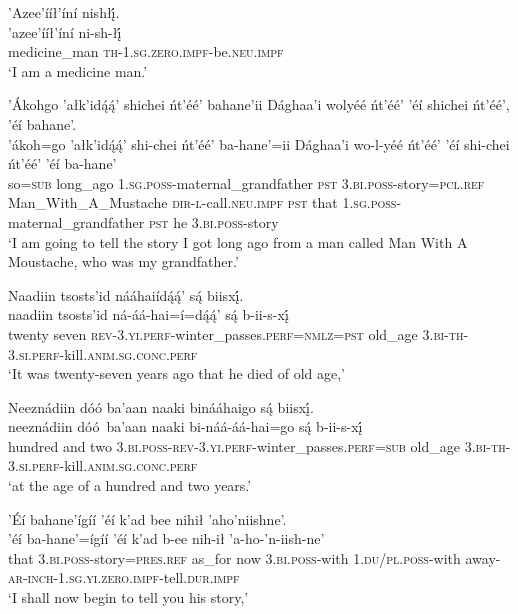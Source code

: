 \ea\label{ex:text4-1-1}
’Azee’ííł’íní nishłį́.\\
\gll ’azee’ííł’íní	ni-sh-łį́\\
     medicine\_man	\textsc{th}-1.\textsc{sg}.\textsc{zero}.\textsc{impf}-be.\textsc{neu}.\textsc{impf}\\
\glt `I am a medicine man.'
\z

\ea\label{ex:text4-1-2}
’Ákohgo ’ałk’idą́ą́’ shichei ńt’éé’ bahane’ii Dághaa’i wolyéé ńt’éé’ ’éí shichei ńt’éé’, ’éí bahane’.\\
\gll ’ákoh=go	’ałk’idą́ą́’	shi-chei	ńt’éé’	ba-hane’=ii	Dághaa’i	wo-l-yéé	ńt’éé’	’éí	shi-chei	ńt’éé’	’éí	ba-hane’\\
     so=\textsc{sub}	long\_ago	1.\textsc{sg}.\textsc{poss}-maternal\_grandfather	\textsc{pst}	3.\textsc{bi}.\textsc{poss}-story=\textsc{pcl}.\textsc{ref}	Man\_With\_A\_Mustache	\textsc{dir}-\textsc{l}-call.\textsc{neu}.\textsc{impf}	\textsc{pst}	that	1.\textsc{sg}.\textsc{poss}-maternal\_grandfather	\textsc{pst}	he	3.\textsc{bi}.\textsc{poss}-story\\
\glt `I am going to tell the story I got long ago from a man called Man With A Moustache, who was my grandfather.'
\z

\ea\label{ex:text4-1-3}
Naadiin tsosts’id nááhaiídą́ą́’ są́ biisxį́.\\
\gll naadiin	tsosts’id	ná-áá-hai=í=dą́ą́’	są́	b-ii-s-xį́\\
     twenty	seven	\textsc{rev}-3.\textsc{yi}.\textsc{perf}-winter\_passes.\textsc{perf}=\textsc{nmlz}=\textsc{pst}	old\_age	3.\textsc{bi}-\textsc{th}-3.\textsc{si}.\textsc{perf}-kill.\textsc{anim}.\textsc{sg}.\textsc{conc}.\textsc{perf}\\
\glt `It was twenty-seven years ago that he died of old age,'
\z

\ea\label{ex:text4-1-4}
Neeznádiin dóó ba’aan naaki binááhaigo są́ biisxį́.\\
\gll neeznádiin	dóó~{ba’aan}	naaki	bi-náá-áá-hai=go	są́	b-ii-s-xį́\\
     hundred	and	two	3.\textsc{bi}.\textsc{poss}-\textsc{rev}-3.\textsc{yi}.\textsc{perf}-winter\_passes.\textsc{perf}=\textsc{sub}	old\_age	3.\textsc{bi}-\textsc{th}-3.\textsc{si}.\textsc{perf}-kill.\textsc{anim}.\textsc{sg}.\textsc{conc}.\textsc{perf}\\
\glt `at the age of a hundred and two years.'
\z

\ea\label{ex:text4-1-5}
’Éí bahane’ígíí ’éí k’ad bee nihił ’aho’niishne’.\\
\gll ’éí	ba-hane’=ígíí	’éí	k’ad	b-ee	nih-ił	’a-ho-’n-iish-ne’\\
     that	3.\textsc{bi}.\textsc{poss}-story=\textsc{pres}.\textsc{ref}	as\_for	now	3.\textsc{bi}.\textsc{poss}-with	1.\textsc{du}/\textsc{pl}.\textsc{poss}-with	away-\textsc{ar}-\textsc{inch}-1.\textsc{sg}.\textsc{yi}.\textsc{zero}.\textsc{impf}-tell.\textsc{dur}.\textsc{impf}\\
\glt `I shall now begin to tell you his story,'
\z


